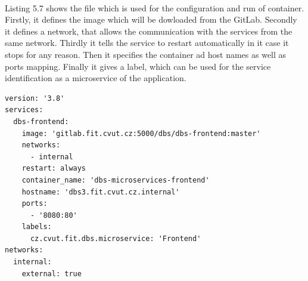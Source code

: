 \

\noindent Listing 5.7 shows the file which is used for the configuration and run of container. Firstly, it defines the image which will be dowloaded from the GitLab. Secondly it defines a network, that allows the communication with the services from the same network. Thirdly it tells the service to restart automatically in it case it stops for any reason. Then it specifies the container ad host names as well as ports mapping. Finally it gives a label, which can be used for the service identification as a microservice of the application.

\begin{lstlisting}
version: '3.8'
services:
  dbs-frontend:
    image: 'gitlab.fit.cvut.cz:5000/dbs/dbs-frontend:master'
    networks:
      - internal
    restart: always
    container_name: 'dbs-microservices-frontend'
    hostname: 'dbs3.fit.cvut.cz.internal'
    ports:
      - '8080:80'
    labels:
      cz.cvut.fit.dbs.microservice: 'Frontend'
networks:
  internal:
    external: true
\end{lstlisting}